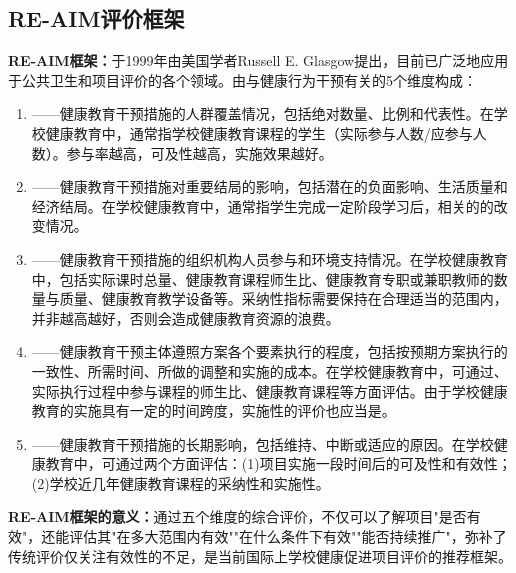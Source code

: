 \subsection{RE-AIM评价框架}

\begin{keybox}
\textbf{RE-AIM框架：}于1999年由美国学者Russell E. Glasgow提出，目前已广泛地应用于公共卫生和项目评价的各个领域。由与健康行为干预有关的5个维度构成：

\begin{enumerate}[leftmargin=*]
    \item {}——健康教育干预措施的人群覆盖情况，包括绝对数量、比例和代表性。在学校健康教育中，通常指学校健康教育课程的学生（实际参与人数/应参与人数）。参与率越高，可及性越高，实施效果越好。

    \item {}——健康教育干预措施对重要结局的影响，包括潜在的负面影响、生活质量和经济结局。在学校健康教育中，通常指学生完成一定阶段学习后，相关的的改变情况。

    \item {}——健康教育干预措施的组织机构人员参与和环境支持情况。在学校健康教育中，包括实际课时总量、健康教育课程师生比、健康教育专职或兼职教师的数量与质量、健康教育教学设备等。采纳性指标需要保持在合理适当的范围内，并非越高越好，否则会造成健康教育资源的浪费。

    \item {}——健康教育干预主体遵照方案各个要素执行的程度，包括按预期方案执行的一致性、所需时间、所做的调整和实施的成本。在学校健康教育中，可通过、实际执行过程中参与课程的师生比、健康教育课程等方面评估。由于学校健康教育的实施具有一定的时间跨度，实施性的评价也应当是。

    \item {}——健康教育干预措施的长期影响，包括维持、中断或适应的原因。在学校健康教育中，可通过两个方面评估：(1)项目实施一段时间后的可及性和有效性；(2)学校近几年健康教育课程的采纳性和实施性。
\end{enumerate}

\textbf{RE-AIM框架的意义：}通过五个维度的综合评价，不仅可以了解项目"是否有效"，还能评估其"在多大范围内有效""在什么条件下有效""能否持续推广"，弥补了传统评价仅关注有效性的不足，是当前国际上学校健康促进项目评价的推荐框架。
\end{keybox}

\newpage
